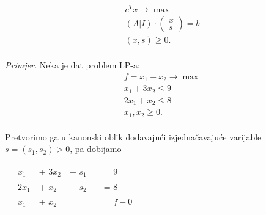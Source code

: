 \documentclass[a4paper, utf8, 11pt, colorlinks]{book}
\begin{document}
\begin{align}
    & c^T x \rightarrow \max \\
    & (A | I) \cdot \left (\begin{array}{c}
         x  \\
         s 
    \end{array} \right ) =  b \\
    & (x, s) \geq 0. \\
\end{align} 

\emph{Primjer.} Neka je dat problem LP-a:
\begin{align*}
    &f= x_1 + x_2 \rightarrow \max \nonumber \\
    & x_1 + 3 x_2 \leq 9 \nonumber \\
    & 2x_1 + x_2 \leq 8  \nonumber \\
    & x_1, x_2 \geq 0. \nonumber \\
\end{align*}
 
 Pretvorimo ga u kanonski oblik dodavajući izjednačavajuće varijable $s = (s_1, s_2)>0$, pa dobijamo 
\begin{center}
\begin{tabular}{llllll}
	\centering
    & $x_1$    & + $3x_2$  &+ $s_1$ & &= 9 \\
    & $2 x_1$ &   + $x_2$  & + $s_2$ & &= 8 \\
    & $x_1$   &   + $x_2$  &\  & &= $f - 0$ \\
\end{tabular} 
\end{center}
  
\end{document}
